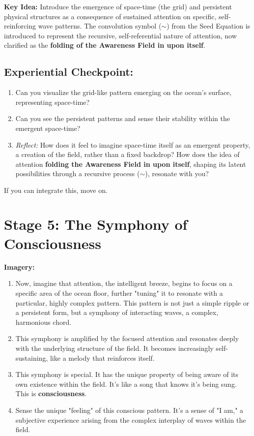 \documentclass[12pt,a4paper]{article}
\begin{document}
\textbf{Key Idea:} Introduce the emergence of space-time (the grid) and persistent physical structures as a consequence of sustained attention on specific, self-reinforcing wave patterns. The convolution symbol (\(\sim\)) from the Seed Equation is introduced to represent the recursive, self-referential nature of attention, now clarified as the \textbf{folding of the Awareness Field in upon itself}.

\subsection*{Experiential Checkpoint:}
\begin{enumerate}
    \item Can you visualize the grid-like pattern emerging on the ocean's surface, representing space-time?
    \item Can you see the persistent patterns and sense their stability within the emergent space-time?
    \item \textit{Reflect:} How does it feel to imagine space-time itself as an emergent property, a creation of the field, rather than a fixed backdrop? How does the idea of attention \textbf{folding the Awareness Field in upon itself}, shaping its latent possibilities through a recursive process (\(\sim\)), resonate with you?
\end{enumerate}

If you can integrate this, move on.

\section*{Stage 5: The Symphony of Consciousness}

\textbf{Imagery:}
\begin{enumerate}
    \item Now, imagine that attention, the intelligent breeze, begins to focus on a specific area of the ocean floor, further "tuning" it to resonate with a particular, highly complex pattern. This pattern is not just a simple ripple or a persistent form, but a symphony of interacting waves, a complex, harmonious chord.
     \item This symphony is amplified by the focused attention and resonates deeply with the underlying structure of the field. It becomes increasingly self-sustaining, like a melody that reinforces itself.
    \item This symphony is special. It has the unique property of being aware of its own existence within the field. It's like a song that knows it's being sung. This is \textbf{consciousness}.
    \item Sense the unique "feeling" of this conscious pattern. It's a sense of "I am," a subjective experience arising from the complex interplay of waves within the field.
\end{enumerate}
\end{document}
